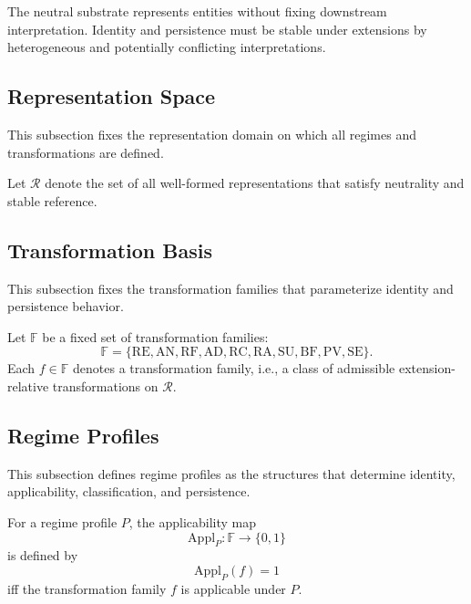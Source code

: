 The neutral substrate represents entities without fixing downstream interpretation.
Identity and persistence must be stable under extensions
by heterogeneous and potentially conflicting interpretations.

\subsection{Representation Space}
\label{subsec:representation_space}

This subsection fixes the representation domain
on which all regimes and transformations are defined.

\begin{definition}
  \label{def:representation_space}
  Let $\mathcal{R}$ denote the set of all well-formed representations
  that satisfy neutrality and stable reference.
\end{definition}

\subsection{Transformation Basis}
\label{subsec:transformation_basis}

This subsection fixes the transformation families
that parameterize identity and persistence behavior.

\begin{definition}
  \label{def:transform_family}
  Let $\mathbb{F}$ be a fixed set of transformation families:
  \[
    \mathbb{F}
    =
    \{ \mathrm{RE}, \mathrm{AN}, \mathrm{RF},
    \mathrm{AD}, \mathrm{RC}, \mathrm{RA},
    \mathrm{SU}, \mathrm{BF}, \mathrm{PV}, \mathrm{SE} \}.
  \]
  Each $f \in \mathbb{F}$ denotes a transformation family,
  i.e., a class of admissible extension-relative transformations on $\mathcal{R}$.
\end{definition}


\subsection{Regime Profiles}
\label{subsec:regime_profiles}

This subsection defines regime profiles as the structures that
determine identity, applicability, classification, and persistence.

\begin{definition}[Applicability]
  \label{def:applicability}
  For a regime profile $P$, the applicability map
  \[
    \mathrm{Appl}_P : \mathbb{F} \to \{0,1\}
  \]
  is defined by
  \[
    \mathrm{Appl}_P(f) = 1
  \]
  iff the transformation family $f$ is applicable under $P$.
\end{definition}

